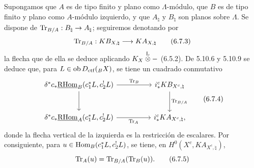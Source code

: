 Supongamos que $A$ es de tipo finito y plano como $\Lambda$-módulo, que $B$ es de tipo finito y plano como $A$-módulo izquierdo, y que $A_{\natural}$ y $B_{\natural}$ son planos sobre $\Lambda$. Se dispone de $\operatorname{Tr}_{B/A}:B_{\natural}\to A_{\natural}$; seguiremos denotando por
\begin{equation}
\operatorname{Tr}_{B/A}:KB_{X,\natural}\longrightarrow KA_{X,\natural}
\tag{6.7.3}
\end{equation}
la flecha que de ella se deduce aplicando $K_X\overset{\mathrm L}{\otimes} -$ (6.5.2). De 5.10.6 y 5.10.9 se deduce que, para $L\in\operatorname{ob} D_{\mathrm{ctf}}({}_BX)$, se tiene un cuadrado conmutativo
\begin{equation}
\begin{tikzcd}[column sep=huge,row sep=large]
\delta^*c_*\uRHom_B(c_1^*L,c_2^!L) \arrow[r,"\Tr_B"] \arrow[d]
& i_*^cKB_{X^c,\natural} \arrow[d,"\Tr_{B/A}"]\\
\delta^*c_*\uRHom_A(c_1^*L,c_2^!L) \arrow[r,"\Tr_A"']
& i_*^cKA_{X^c,\natural},
\end{tikzcd}
\tag{6.7.4}
\end{equation}
donde la flecha vertical de la izquierda es la restricción de escalares. Por consiguiente, para $u\in\operatorname{Hom}_B(c_1^*L,c_2^!L)$, se tiene, en $H^0(X^c,KA_{X^c,\natural})$,
\begin{equation}
\operatorname{Tr}_A(u)=\operatorname{Tr}_{B/A}(\operatorname{Tr}_B(u)).
\tag{6.7.5}
\end{equation}
